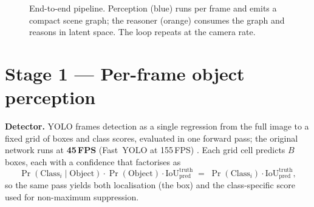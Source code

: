 \documentclass[10pt,letterpaper]{article}
\begin{document}
\begin{figure}[H]
\centering
{}
\caption{End-to-end pipeline. Perception (blue) runs per frame and emits a compact scene graph;
the reasoner (orange) consumes the graph and reasons in latent space. The loop repeats at the
camera rate.}
\end{figure}

\section{Stage 1 --- Per-frame object perception}

\textbf{Detector.} YOLO frames detection as a single regression from the full image to a fixed
grid of boxes and class scores, evaluated in one forward pass; the original network runs at
\textbf{45\,FPS} (Fast~YOLO at 155\,FPS) \cite{redmon2016}. Each grid cell predicts $B$ boxes,
each with a confidence that factorises as
\begin{equation}
\Pr(\text{Class}_i \mid \text{Object}) \cdot \Pr(\text{Object}) \cdot \mathrm{IoU}^{\text{truth}}_{\text{pred}}
  \;=\; \Pr(\text{Class}_i)\cdot \mathrm{IoU}^{\text{truth}}_{\text{pred}},
\end{equation}
so the same pass yields both localisation (the box) and the class-specific score used for
non-maximum suppression.
\end{document}
